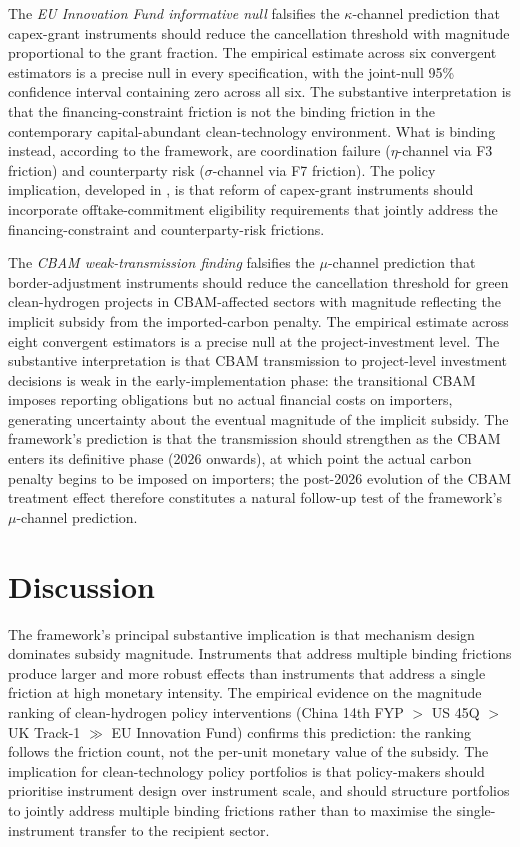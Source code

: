 \documentclass[12pt,a4paper]{article}
\theoremstyle{plain}
\theoremstyle{definition}
\begin{document}
The \emph{EU Innovation Fund informative null} falsifies the $\kappa$-channel prediction that capex-grant instruments should reduce the cancellation threshold with magnitude proportional to the grant fraction. The empirical estimate across six convergent estimators is a precise null in every specification, with the joint-null 95\% confidence interval containing zero across all six. The substantive interpretation is that the financing-constraint friction is not the binding friction in the contemporary capital-abundant clean-technology environment. What is binding instead, according to the framework, are coordination failure ($\eta$-channel via F3 friction) and counterparty risk ($\sigma$-channel via F7 friction). The policy implication, developed in \cite{saakstra2026paper2, saakstra2026paper3}, is that reform of capex-grant instruments should incorporate offtake-commitment eligibility requirements that jointly address the financing-constraint and counterparty-risk frictions.

The \emph{CBAM weak-transmission finding} falsifies the $\mu$-channel prediction that border-adjustment instruments should reduce the cancellation threshold for green clean-hydrogen projects in CBAM-affected sectors with magnitude reflecting the implicit subsidy from the imported-carbon penalty. The empirical estimate across eight convergent estimators is a precise null at the project-investment level. The substantive interpretation is that CBAM transmission to project-level investment decisions is weak in the early-implementation phase: the transitional CBAM imposes reporting obligations but no actual financial costs on importers, generating uncertainty about the eventual magnitude of the implicit subsidy. The framework's prediction is that the transmission should strengthen as the CBAM enters its definitive phase (2026 onwards), at which point the actual carbon penalty begins to be imposed on importers; the post-2026 evolution of the CBAM treatment effect therefore constitutes a natural follow-up test of the framework's $\mu$-channel prediction.

\section{Discussion}
\label{sec:discussion}

The framework's principal substantive implication is that mechanism design dominates subsidy magnitude. Instruments that address multiple binding frictions produce larger and more robust effects than instruments that address a single friction at high monetary intensity. The empirical evidence on the magnitude ranking of clean-hydrogen policy interventions (China 14th FYP $>$ US 45Q $>$ UK Track-1 $\gg$ EU Innovation Fund) confirms this prediction: the ranking follows the friction count, not the per-unit monetary value of the subsidy. The implication for clean-technology policy portfolios is that policy-makers should prioritise instrument design over instrument scale, and should structure portfolios to jointly address multiple binding frictions rather than to maximise the single-instrument transfer to the recipient sector.
\end{document}
